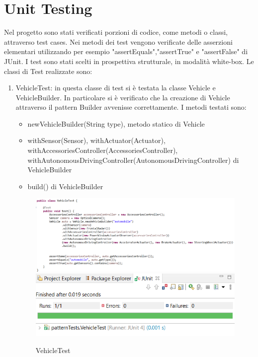 \documentclass{article}
\begin{document}
\section{Unit Testing}
Nel progetto sono stati verificati porzioni di codice, come metodi o classi, attraverso test cases. Nei metodi dei test vengono verificate delle asserzioni elementari utilizzando per esempio "assertEquals","assertTrue" e "assertFalse" di JUnit. I test sono stati scelti in prospettiva strutturale, in modalità white-box.
Le classi di Test realizzate sono:
\begin{enumerate}
\item VehicleTest: in questa classe di test si è testata la classe Vehicle e VehicleBuilder. In particolare si è verificato che la creazione di Vehicle attraverso il pattern Builder avvenisse correttamente. I metodi testati sono:
\begin{itemize}
    \item  newVehicleBuilder(String type), metodo statico di Vehicle
    \item withSensor(Sensor), withActuator(Actuator), withAccessoriesController(AccessoriesController), withAutonomousDrivingController(AutonomousDrivingController) di VehicleBuilder
    \item build() di VehicleBuilder
\end{itemize}

\begin{figure} [H]
\begin{center}
\includegraphics[scale=0.6]{VehicleTest.png}
\includegraphics[scale=0.6]{VehicleTestJUnit.png}
\end{center}
\caption{VehicleTest}
\end{figure}


\end{enumerate}
\end{document}

